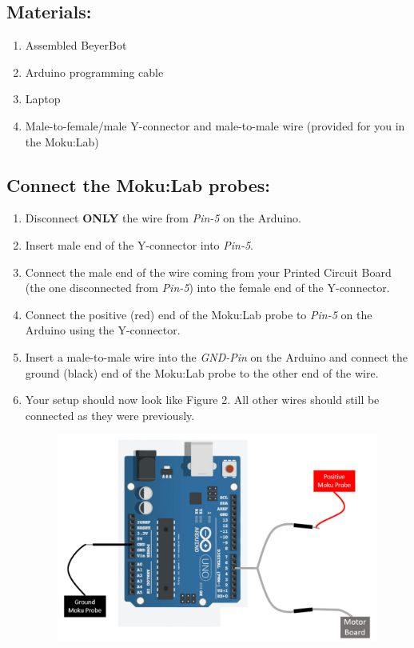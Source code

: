 \documentclass{handout}
\begin{document}
	\subsection{Materials:}
	
	\begin{enumerate}
		\item Assembled BeyerBot
		\item Arduino programming cable
		\item Laptop
		\item Male-to-female/male Y-connector and male-to-male wire (provided for you in the Moku:Lab)
	\end{enumerate}

	\subsection{Connect the Moku:Lab probes:}
	\begin{enumerate}
		\item Disconnect \textbf{ONLY} the wire from \textit{Pin-5} on the Arduino.
		\item Insert male end of the Y-connector into \textit{Pin-5}.
		\item Connect the male end of the wire coming from your Printed Circuit Board (the one disconnected from \textit{Pin-5}) into the female end of the Y-connector.
		\item Connect the positive (red) end of the Moku:Lab probe to \textit{Pin-5} on the Arduino using the Y-connector.
		\item Insert a male-to-male wire into the \textit{GND-Pin} on the Arduino and connect the ground (black) end of the Moku:Lab probe to the other end of the wire.
		\item Your setup should now look like Figure 2. All other wires should still be connected as they were previously.
		\begin{figure} [H]
			\centering
			\includegraphics[width=.75\textwidth]{Figure4.PNG}
			\caption{}
		\end{figure}
	\end{enumerate}
	
\end{document}
